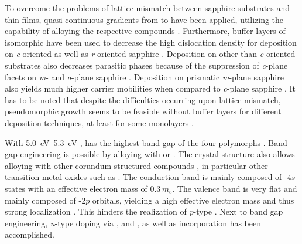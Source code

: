 To overcome the problems of lattice mismatch between sapphire substrates and \agao{} thin films, quasi-continuous gradients from  to \agao{} have been applied, utilizing the capability of alloying the respective compounds
    \cite{jinno2016}.
Furthermore, buffer layers of isomorphic  have been used to decrease the high dislocation density for deposition on \textit{c}-oriented
    \cite{stepanov2021,polyakov2022a}
as well as \textit{r}-oriented sapphire
    \cite{polyakov2022}.
Deposition on other than \textit{c}-oriented substrates also decreases parasitic phases because of the suppression of \textit{c}-plane facets on \textit{m}- and \textit{a}-plane sapphire
    \cite{jinno2021}.
Deposition on prismatic \textit{m}-plane sapphire also yields much higher carrier mobilities when compared to \textit{c}-plane sapphire
    \cite{akaiwa2020}.
It has to be noted that despite the difficulties occurring upon lattice mismatch, pseudomorphic growth seems to be feasible without buffer layers for different deposition techniques, at least for some monolayers
    \cite{schewski2015}.

With \qtyrange{5.0}{5.3}{\eV}
    \cite{yang2022},
\agao{} has the highest band gap of the four polymorphs
    \cite{pearton2018}.
Band gap engineering is possible by alloying with 
    \cite{jinno2021}
or 
    \cite{hassa2020}.
The crystal structure also allows alloying with other corundum structured compounds
    \cite{yang2022},
in particular other transition metal oxides such as 
    \cite{polyakov2022,polyakov2022a}.
The conduction band is mainly composed of -$4s$ states with an effective electron mass of $0.3\,m_e$.
The valence band is very flat and mainly composed of -$2p$ orbitals, yielding a high effective electron mass and thus strong localization
    \cite{pearton2018}.
This hinders the realization of \textit{p}-type \agao.
Next to band gap engineering, \textit{n}-type doping via ,  and  
    \cite{vogt2023},
as well as 
    \cite{vogt2024}
incorporation has been accomplished.
